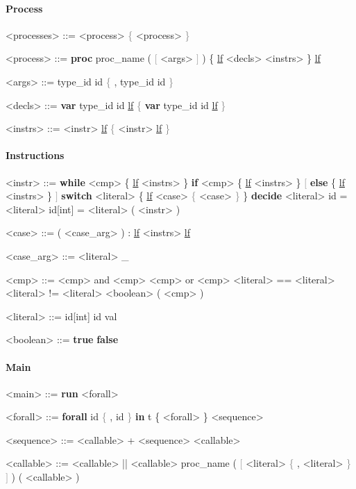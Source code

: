 \documentclass{article}
\begin{document}
\paragraph{Process}
\begin{grammar}
                
  <processes> ::= <process> \textcolor{gray}{\{} <process> \textcolor{gray}{\}}

  <process> ::= \textbf{proc} proc\_name ( \textcolor{gray}{$[$} <args> \textcolor{gray}{$]$} ) \{ \underline{lf}  <decls> <instrs> \} \underline{lf}
  
  <args> ::= type\_id id \textcolor{gray}{\{} , type\_id id \textcolor{gray}{\}}
  
  <decls> ::= \textbf{var} type\_id id \underline{lf} \textcolor{gray}{\{} \textbf{var} type\_id id \underline{lf} \textcolor{gray}{\}}
              
  <instrs> ::= <instr> \underline{lf} \textcolor{gray}{\{} <instr> \underline{lf} \textcolor{gray}{\}}
\end{grammar}

\paragraph{Instructions}
\begin{grammar}
  <instr> ::= \textbf{while} <cmp> \{ \underline{lf} <instrs> \}
  \alt \textbf{if} <cmp> \{ \underline{lf} <instrs> \} \textcolor{gray}{$[$} \textbf{else} \{ \underline{lf} <instrs> \} \textcolor{gray}{$]$}
  \alt \textbf{switch} <literal> \{ \underline{lf} <case> \textcolor{gray}{\{} <case> \textcolor{gray}{\}} \}
  \alt \textbf{decide} <literal>
  \alt id = <literal>
  \alt id[int] = <literal>
  \alt ( <instr> )
                
  <case> ::= ( <case\_arg> ) : \underline{lf} <instrs> \underline{lf}
                
  <case\_arg> ::= <literal>
  \alt \_
  
  <cmp> ::= <cmp> and <cmp> 
  \alt <cmp> or <cmp>
  \alt <literal> == <literal>
  \alt <literal> != <literal>
  \alt <boolean>
  \alt ( <cmp> )
  
  <literal> ::= id[int]
  \alt id
  \alt val
                
  <boolean> ::= \textbf{true}
  \alt \textbf{false}
\end{grammar}

\paragraph{Main}
\begin{grammar}
  <main> ::= \textbf{run} <forall>
  
  <forall> ::= \textbf{forall} id \textcolor{gray}{\{} , id \textcolor{gray}{\}}  \textbf{in} t \{ <forall> \}
  \alt <sequence>
  
  <sequence> ::= <callable> + <sequence>
  \alt <callable>
  
  <callable> ::= <callable> || <callable>
  \alt proc\_name ( \textcolor{gray}{$[$} <literal> \textcolor{gray}{\{} , <literal> \textcolor{gray}{\}} \textcolor{gray}{$]$} )
  \alt ( <callable> )
\end{grammar}
\end{document}
